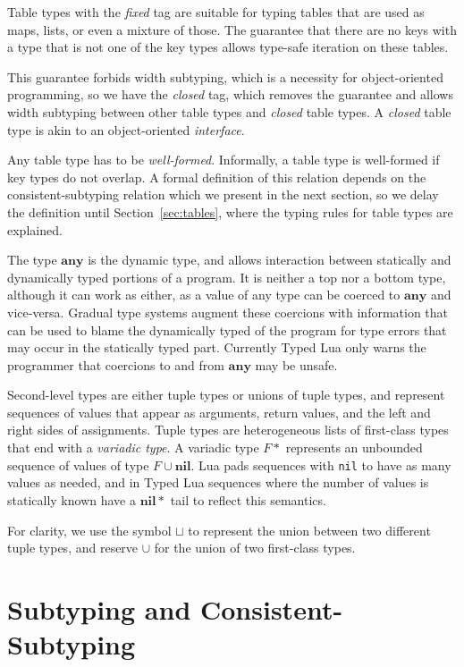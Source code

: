 \documentclass[preprint]{sigplanconf}
\newcommand{\Any}{\mathbf{any}}
\newcommand{\Nil}{\mathbf{nil}}
\begin{document}
Table types with the {\em fixed} tag are suitable for typing tables that are used as maps, lists, or even a mixture of those. The guarantee that there are no keys with a type that is not
one of the key types allows type-safe iteration on these
tables.

This guarantee forbids width subtyping, which is a necessity
for object-oriented programming, so we have the {\em closed}
tag, which removes the guarantee and allows width subtyping
between other table types and {\em closed} table types. A {\em closed} table type is akin to an object-oriented {\em interface}.

Any table type has to be \emph{well-formed}.
Informally, a table type is well-formed if key types do not overlap. A formal definition of this relation depends on
the consistent-subtyping relation which we present in the
next section, so we delay the definition until Section~\ref{sec:tables}, where the typing rules for
table types are explained.

The type $\Any$ is the dynamic type, and allows
interaction between statically and dynamically typed
portions of a program. It is neither a top nor a bottom
type, although it can work as either, as a value of
any type can be coerced to $\Any$ and vice-versa.
Gradual type systems augment these coercions with
information that can be used to blame the dynamically
typed of the program for type errors that may occur in the
statically typed part. Currently Typed Lua only 
warns the programmer that coercions to and from $\Any$
may be unsafe.

Second-level types are either tuple types or unions of tuple types, and represent sequences of values that appear as arguments, return values, and the left and right sides of
assignments. Tuple types are heterogeneous lists of first-class
types that end with a {\em variadic type}.
A variadic type $F{*}$ represents an unbounded sequence of values of type $F \cup \Nil$. Lua pads sequences with {\tt nil} to
have as many values as needed, and in Typed Lua sequences
where the number of values is statically known have a $\Nil{*}$
tail to reflect this semantics.

For clarity, we use the symbol $\sqcup$ to represent the union between two different tuple types, and reserve $\cup$ for the
union of two first-class types.

\section{Subtyping and Consistent-Subtyping}
\label{sec:subtyping}
\end{document}
